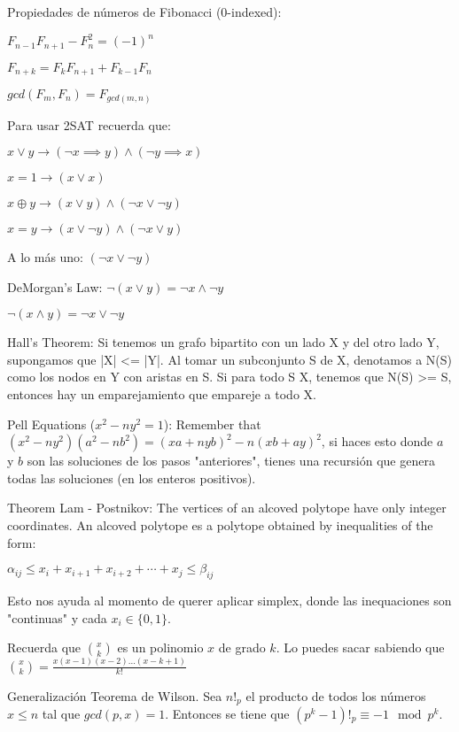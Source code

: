 {    Propiedades de números de Fibonacci (0-indexed): 

    \begin{center}
        $F_{n-1}F_{n+1} - F_n^2 = (-1)^n$

        $F_{n+k} = F_kF_{n+1} + F_{k-1}F_n$

        $gcd(F_m, F_n) = F_{gcd(m,n)}$
    \end{center}


    Para usar 2SAT recuerda que:

    \begin{center}
        $x \lor y     \longrightarrow (\lnot x \implies y) \land (\lnot y \implies x)$

        $x = 1        \longrightarrow (x \lor x)$

        $x \oplus y   \longrightarrow (x \lor y) \land (\lnot x \lor \lnot y)$

        $x = y        \longrightarrow (x \lor \lnot y) \land (\lnot x \lor y)$

        A lo más uno:
        $(\lnot x \lor \lnot y)$


        DeMorgan's Law:
        $\lnot (x \lor y)  = \lnot x \land \lnot y$

        $\lnot (x \land y) = \lnot x \lor \lnot y$
    \end{center}
    
    Hall's Theorem: Si tenemos un grafo bipartito con un lado X y del otro lado Y, supongamos que |X| <= |Y|. Al tomar un subconjunto S de X, denotamos a N(S) como los nodos en Y con aristas en S. Si para todo S \subseteq X, tenemos que N(S) >= S, entonces hay un emparejamiento que empareje a todo X.

    Pell Equations ($x^2 - n y^2 = 1$): Remember that $(x^2 - n y^2)(a^2 - n b^2) = (xa + nyb)^2 - n(xb + ay)^2$, si haces esto donde $a$ y $b$ son las soluciones de los pasos "anteriores", tienes una recursión que genera todas las soluciones (en los enteros positivos).

    Theorem Lam - Postnikov: The vertices of an alcoved polytope have only integer coordinates. An alcoved polytope es a polytope obtained by inequalities of the form:

    $\alpha_{ij} \leq x_i + x_{i+1} + x_{i+2} + \cdots + x_j \leq \beta_{ij}$

    Esto nos ayuda al momento de querer aplicar simplex, donde las inequaciones son "continuas" y cada $x_i \in \{0, 1\}$.

    Recuerda que ${\binom {x}{k}}$ es un polinomio $x$ de grado $k$. Lo puedes sacar sabiendo que ${\binom {x}{k}} = \frac{x(x-1)(x-2)...(x-k+1)}{k!}$

    Generalización Teorema de Wilson. Sea $n!_p$ el producto de todos los números $x \leq n$ tal que $gcd(p,x)=1$. Entonces se tiene que $(p^k - 1)!_p \equiv -1 \mod{p^k}$.

}